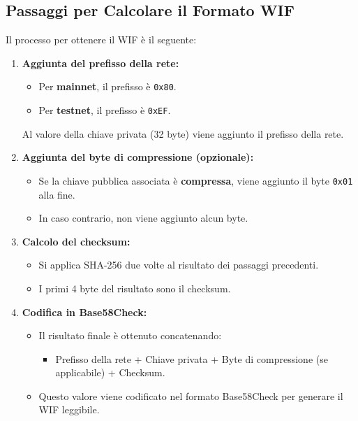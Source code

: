 \documentclass[a4paper,12pt]{article}
\begin{document}
\subsection{Passaggi per Calcolare il Formato WIF}
Il processo per ottenere il WIF è il seguente:

\begin{enumerate}
    \item \textbf{Aggiunta del prefisso della rete:}
    \begin{itemize}
        \item Per \textbf{mainnet}, il prefisso è \texttt{0x80}.
        \item Per \textbf{testnet}, il prefisso è \texttt{0xEF}.
    \end{itemize}
    Al valore della chiave privata (32 byte) viene aggiunto il prefisso della rete.

    \item \textbf{Aggiunta del byte di compressione (opzionale):}
    \begin{itemize}
        \item Se la chiave pubblica associata è \textbf{compressa}, viene aggiunto il byte \texttt{0x01} alla fine.
        \item In caso contrario, non viene aggiunto alcun byte.
    \end{itemize}

    \item \textbf{Calcolo del checksum:}
    \begin{itemize}
        \item Si applica SHA-256 due volte al risultato dei passaggi precedenti.
        \item I primi 4 byte del risultato sono il checksum.
    \end{itemize}

    \item \textbf{Codifica in Base58Check:}
    \begin{itemize}
        \item Il risultato finale è ottenuto concatenando:
        \begin{itemize}
            \item Prefisso della rete + Chiave privata + Byte di compressione (se applicabile) + Checksum.
        \end{itemize}
        \item Questo valore viene codificato nel formato Base58Check per generare il WIF leggibile.
    \end{itemize}
\end{enumerate}
\end{document}
